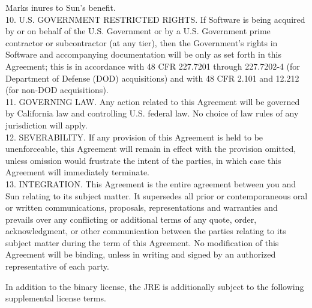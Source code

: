 {   Marks inures to Sun's benefit.
\\[4pt]
  10. U.S. GOVERNMENT RESTRICTED RIGHTS. If Software is being acquired
  by or on behalf of the U.S. Government or by a U.S. Government prime
  contractor or subcontractor (at any tier), then the Government's
  rights in Software and accompanying documentation will be only as
  set forth in this Agreement; this is in accordance with 48 CFR
  227.7201 through 227.7202-4 (for Department of Defense (DOD)
  acquisitions) and with 48 CFR 2.101 and 12.212 (for non-DOD
  acquisitions).
\\[4pt]
  11. GOVERNING LAW. Any action related to this Agreement will be
  governed by California law and controlling U.S. federal law. No
  choice of law rules of any jurisdiction will apply.
\\[4pt]
  12. SEVERABILITY. If any provision of this Agreement is held to be
  unenforceable, this Agreement will remain in effect with the
  provision omitted, unless omission would frustrate the intent of the
  parties, in which case this Agreement will immediately terminate.
\\[4pt]
  13. INTEGRATION. This Agreement is the entire agreement between you
  and Sun relating to its subject matter. It supersedes all prior or
  contemporaneous oral or written communications, proposals,
  representations and warranties and prevails over any conflicting or
  additional terms of any quote, order, acknowledgment, or other
  communication between the parties relating to its subject matter
  during the term of this Agreement. No modification of this Agreement
  will be binding, unless in writing and signed by an authorized
  representative of each party.
}


\setlength{\baselineskip}{\oldbaselineskip}
\noindent
In addition to the binary license, the JRE is additionally subject to
the following supplemental license terms.
\\

